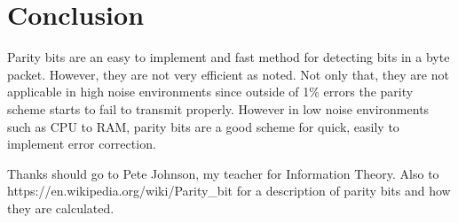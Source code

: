\documentclass{article}
\begin{document}
   \section{Conclusion}
      Parity bits are an easy to implement and fast method for detecting bits
      in a byte packet. However, they are not very efficient as noted. Not only
      that, they are not applicable in high noise environments since outside of
      1\% errors the parity scheme starts to fail to transmit properly. However
      in low noise environments such as CPU to RAM, parity bits are a good scheme
      for quick, easily to implement error correction.
      
      Thanks should go to Pete Johnson, my teacher for Information Theory. Also
      to https://en.wikipedia.org/wiki/Parity\_bit for a description of parity
      bits and how they are calculated.
\end{document}
